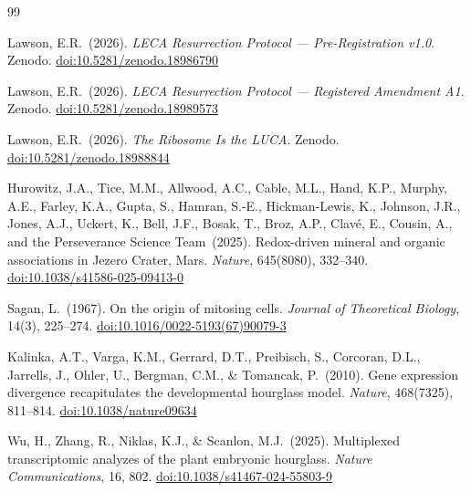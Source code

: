 \documentclass[11pt, a4paper]{article}
\begin{document}
\begin{thebibliography}{99}


Lawson, E.R.\ (2026).
\textit{LECA Resurrection Protocol ---
Pre-Registration v1.0}.
Zenodo.
\href{https://doi.org/10.5281/zenodo.18986790}
{doi:10.5281/zenodo.18986790}

Lawson, E.R.\ (2026).
\textit{LECA Resurrection Protocol ---
Registered Amendment A1}.
Zenodo.
\href{https://doi.org/10.5281/zenodo.18989573}
{doi:10.5281/zenodo.18989573}

Lawson, E.R.\ (2026).
\textit{The Ribosome Is the LUCA}.
Zenodo.
\href{https://doi.org/10.5281/zenodo.18988844}
{doi:10.5281/zenodo.18988844}


Hurowitz, J.A., Tice, M.M., Allwood, A.C.,
Cable, M.L., Hand, K.P., Murphy, A.E.,
Farley, K.A., Gupta, S., Hamran, S.-E.,
Hickman-Lewis, K., Johnson, J.R., Jones, A.J.,
Uckert, K., Bell, J.F., Bosak, T., Broz, A.P.,
Clav\'{e}, E., Cousin, A., and the
Perseverance Science Team\ (2025).
Redox-driven mineral and organic associations
in Jezero Crater, Mars.
\textit{Nature}, 645(8080), 332--340.
\href{https://doi.org/10.1038/s41586-025-09413-0}
{doi:10.1038/s41586-025-09413-0}


Sagan, L.\ (1967).
On the origin of mitosing cells.
\textit{Journal of Theoretical Biology},
14(3), 225--274.
\href{https://doi.org/10.1016/0022-5193(67)90079-3}
{doi:10.1016/0022-5193(67)90079-3}


Kalinka, A.T., Varga, K.M., Gerrard, D.T.,
Preibisch, S., Corcoran, D.L., Jarrells, J.,
Ohler, U., Bergman, C.M., \& Tomancak, P.\ (2010).
Gene expression divergence recapitulates
the developmental hourglass model.
\textit{Nature}, 468(7325), 811--814.
\href{https://doi.org/10.1038/nature09634}
{doi:10.1038/nature09634}


Wu, H., Zhang, R., Niklas, K.J.,
\& Scanlon, M.J.\ (2025).
Multiplexed transcriptomic analyzes of the
plant embryonic hourglass.
\textit{Nature Communications}, 16, 802.
\href{https://doi.org/10.1038/s41467-024-55803-9}
{doi:10.1038/s41467-024-55803-9}


\end{thebibliography}
\end{document}
